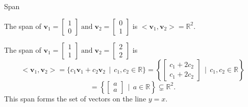 \documentclass{beamer}
\newcommand{\vv}{\mathbf{v}}
\newcommand{\R}{\mathbb{R}}
\begin{document}
\begin{frame}{Span}

\begin{example}
    The span of \(
    \vv_1 = \begin{bmatrix} 1 \\ 0\end{bmatrix} \; \text{and} \; \vv_2 = \begin{bmatrix} 0\\ 1 \end{bmatrix}
    \) is \pause    $<\vv_1,\vv_2>=\R^2.$
\end{example}\pause
 \begin{example}
     The span of \(
    \vv_1 = \begin{bmatrix} 1 \\ 1\end{bmatrix} \; \text{and} \; \vv_2 = \begin{bmatrix} 2\\ 2 \end{bmatrix}
    \) is
    \pause
    \[  <\vv_1, \vv_2> = \{c_1\vv_1 + c_2\vv_2 \,\mid\, c_1, c_2 \in \mathbb{R}\}= \left\{\begin{bmatrix} c_1+2c_2 \\ c_1+2c_2 \end{bmatrix} \,\mid\, c_1, c_2 \in \mathbb{R}\right\}
    \]    \pause   \[ = \left\{\begin{bmatrix} a \\ a \end{bmatrix} \,\mid\, a \in \mathbb{R}\right\} \subsetneq \R^2. \]\pause This span forms the set of vectors on the line $y=x$.
  \end{example}
\end{frame}
\end{document}
